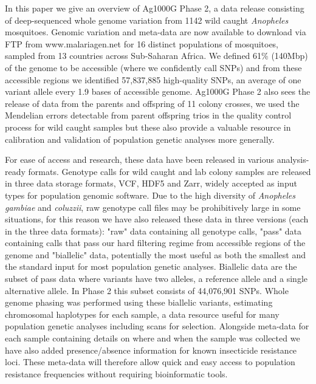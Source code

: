 \documentclass[a4paper,11pt,abstracton,hidelinks]{scrartcl}
\begin{document}
In this paper we give an overview of Ag1000G Phase 2, a data release consisting of deep-sequenced whole genome variation from 1142 wild caught \emph{Anopheles} mosquitoes.
%
Genomic variation and meta-data are now available to download via FTP from www.malariagen.net for 16 distinct populations of mosquitoes, sampled from 13 countries across Sub-Saharan Africa. 
%
We defined 61\% (140Mbp) of the genome to be accessible (where we confidently call SNPs) and from these accessible regions we identified 57,837,885 high-quality SNPs, an average of one variant allele every 1.9 bases of accessible genome.
%
Ag1000G Phase 2 also sees the release of data from the parents and offspring of 11 colony crosses, we used the Mendelian errors detectable from parent offspring trios in the quality control process for wild caught samples but these also provide a valuable resource in calibration and validation of population genetic analyses more generally.


For ease of access and research, these data have been released in various analysis-ready formats.
%
Genotype calls for wild caught and lab colony samples are released in three data storage formats, VCF, HDF5 and Zarr, widely accepted as input types for population genomic software.
%
Due to the high diversity of \textit{Anopheles gambiae} and \textit{coluzzii}, raw genotype call files may be prohibitively large in some situations, for this reason we have also released these data in three versions (each in the three data formats): 
%
"raw" data containing all genotype calls, "pass" data containing calls that pass our hard filtering regime from accessible regions of the genome and "biallelic" data, potentially the most useful as both the smallest and the standard input for most population genetic analyses.
%
Biallelic data are the subset of pass data where variants have two alleles, a reference allele and a single alternative allele.
%
In Phase 2 this subset consists of 44,076,901 SNPs.
%
Whole genome phasing was performed using these biallelic variants, estimating chromosomal haplotypes for each sample, a data resource useful for many population genetic analyses including scans for selection.
%
Alongside meta-data for each sample containing details on where and when the sample was collected we have also added presence/absence information for known insecticide resistance loci.
%
These meta-data will therefore allow quick and easy access to population resistance frequencies without requiring bioinformatic tools. 
\end{document}
